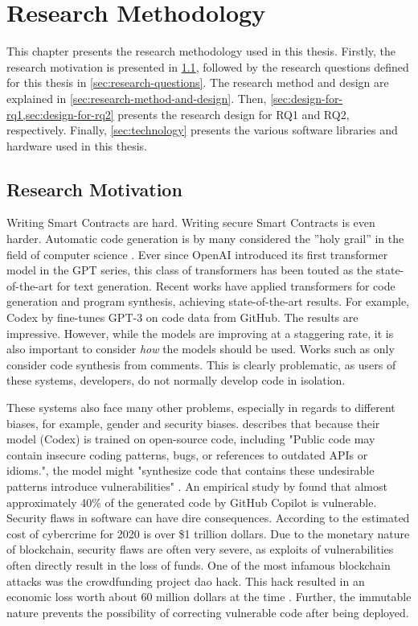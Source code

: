 \chapter{Research Methodology}
\label{chap:research-methodoloy}
This chapter presents the research methodology used in this thesis. Firstly, the research motivation is presented in \cref{sec:research-motivation}, followed by the research questions defined for this thesis in \cref{sec:research-questions}. The research method and design are explained in \cref{sec:research-method-and-design}. Then, \cref{sec:design-for-rq1,sec:design-for-rq2} presents the research design for RQ1 and RQ2, respectively. Finally, \cref{sec:technology} presents the various software libraries and hardware used in this thesis.

\section{Research Motivation}
\label{sec:research-motivation}
Writing Smart Contracts are hard. Writing secure Smart Contracts is even harder. Automatic code generation is by many considered the ”holy grail” in the field of computer science \cite{PGL-010}. Ever since OpenAI introduced its first transformer model in the GPT series, this class of transformers has been touted as the state-of-the-art for text generation. Recent works have applied transformers for code generation and program synthesis, achieving state-of-the-art results. For example, Codex by \textcite{chen2021codex} fine-tunes GPT-3 \cite{brown2020language} on code data from GitHub. The results are impressive. However, while the models are improving at a staggering rate, it is also important to consider \textit{how} the models should be used. Works such as \cite{chen2021codex,colin2020pymt5} only consider code synthesis from comments. This is clearly problematic, as users of these systems, developers, do not normally develop code in isolation.

These systems also face many other problems, especially in regards to different biases, for example, gender and security biases. \textcite{chen2021codex} describes that because their model (Codex) is trained on open-source code, including "Public code may contain insecure coding patterns, bugs, or references to outdated APIs or idioms.", the model might "synthesize code that contains these undesirable patterns introduce vulnerabilities" \cite{copilot}. An empirical study by \textcite{pearce2021asleep} found that almost approximately 40\% of the generated code by GitHub Copilot is vulnerable. Security flaws in software can have dire consequences. According to \textcite{smith2020hidden} the estimated cost of cybercrime for 2020 is over \$1 trillion dollars. Due to the monetary nature of blockchain, security flaws are often very severe, as exploits of vulnerabilities often directly result in the loss of funds. One of the most infamous blockchain attacks was the crowdfunding project \acrfull{dao} hack. This hack resulted in an economic loss worth about 60 million dollars at the time \cite{atzei2017asurvey}. Further, the immutable nature prevents the possibility of correcting vulnerable code after being deployed.

